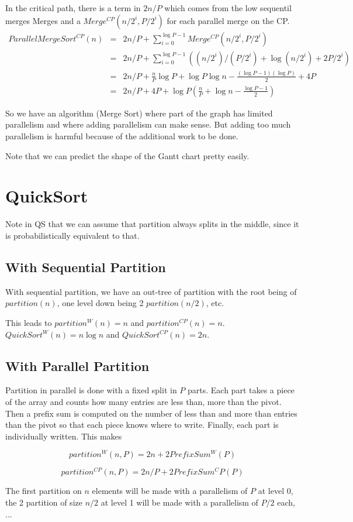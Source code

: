 \documentclass{article}
\begin{document}
In the critical path, there is a term in $2 n/P$ which comes from the
low sequentil merges Merges and a $Merge^{CP}(n/2^i,P/2^i)$ for each
parallel merge on the CP.
\begin{align}
  ParallelMergeSort^{CP}(n) & = & 2n/P + \sum_{i=0}^{\log P-1} Merge^{CP}(n/2^i,P/2^i) \\
  & = & 2n/P + \sum_{i=0}^{\log P-1} \left ( (n/2^i)/(P/2^i) + \log (n/2^i) + 2P/2^i \right )\\
  & = & 2n/P + \frac{n}{P} \log P  + \log P \log n - \frac{(\log P - 1)(\log P)}{2}  + 4P \\
  & = & 2n/P + 4P + \log P \left ( \frac{n}{P}   +  \log n - \frac{\log P - 1}{2}  \right )
\end{align}

So we have an algorithm (Merge Sort) where part of the graph has
limited parallelism and where adding parallelism can make sense. But
adding too much parallelism is harmful because of the additional work
to be done.

Note that we can predict the shape of the Gantt chart pretty easily.

\section{QuickSort}

Note in QS that we can assume that partition always splits in the
middle, since it is probabilistically equivalent to that.

\subsection{With Sequential Partition}

With sequential partition, we have an out-tree of partition with the
root being of $partition(n)$, one level down being 2 $partition(n/2)$,
etc.

This leads to $partition^W(n) = n$ and
$partition^{CP}(n)=n$. $QuickSort^W(n) = n \log n$ and
$QuickSort^{CP}(n) = 2n$.

\subsection{With Parallel Partition}

Partition in parallel is done with a fixed split in $P$ parts. Each
part takes a piece of the array and counts how many entries are less
than, more than the pivot. Then a prefix sum is computed on the number
of less than and more than entries than the pivot so that each piece
knows where to write. Finally, each part is individually written. This
makes

$$partition^W(n, P) = 2 n + 2 PrefixSum^W(P)$$

$$partition^{CP}(n, P) = 2 n/P + 2 PrefixSum^CP(P)$$

The first partition on $n$ elements will be made with a parallelism of
$P$ at level 0, the 2 partition of size $n/2$ at level 1 will be made with a parallelism of $P/2$ each, ...
\end{document}
